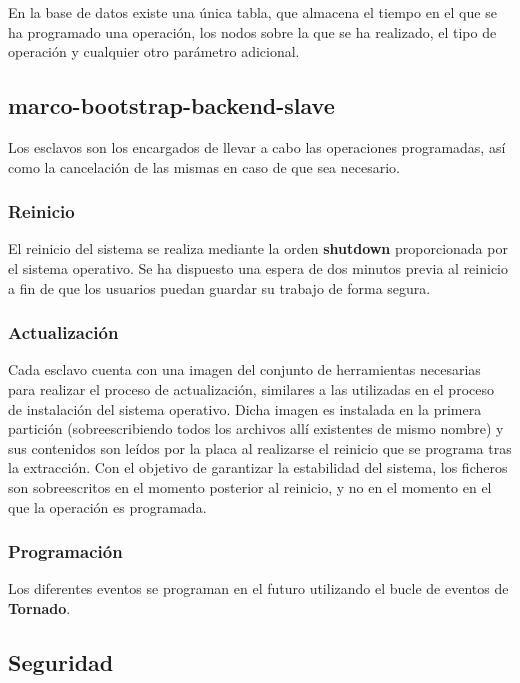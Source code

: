 \documentclass{article}
\begin{document}
En la base de datos existe una única tabla, que almacena el tiempo en el que se ha programado una operación, los nodos sobre la que se ha realizado, el tipo de operación y cualquier otro parámetro adicional.

\subsection{marco-bootstrap-backend-slave}

Los esclavos son los encargados de llevar a cabo las operaciones programadas, así como la cancelación de las mismas en caso de que sea necesario.

\subsubsection{Reinicio}

El reinicio del sistema se realiza mediante la orden \textbf{shutdown} proporcionada por el sistema operativo. Se ha dispuesto una espera de dos minutos previa al reinicio a fin de que los usuarios puedan guardar su trabajo de forma segura.

\subsubsection{Actualización}

Cada esclavo cuenta con una imagen del conjunto de herramientas necesarias para realizar el proceso de actualización, similares a las utilizadas en el proceso de instalación del sistema operativo. Dicha imagen es instalada en la primera partición (sobreescribiendo todos los archivos allí existentes de mismo nombre) y sus contenidos son leídos por la placa al realizarse el reinicio que se programa tras la extracción. Con el objetivo de garantizar la estabilidad del sistema, los ficheros son sobreescritos en el momento posterior al reinicio, y no en el momento en el que la operación es programada.

\subsubsection{Programación}

Los diferentes eventos se programan en el futuro utilizando el bucle de eventos de \textbf{Tornado}.
\subsection{Seguridad}
\end{document}
